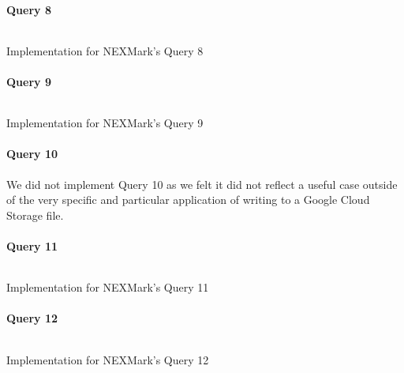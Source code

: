 \paragraph{Query 8}
\begin{listing}[H]
  \inputminted[firstline=680,lastline=689]{rust}{benchmarks/src/nexmark.rs}
  \caption{Implementation for NEXMark's Query 8}
  \label{lst:nexmark-query8}
\end{listing}

\paragraph{Query 9}
\begin{listing}[H]
  \inputminted[firstline=708,lastline=744]{rust}{benchmarks/src/nexmark.rs}
  \caption{Implementation for NEXMark's Query 9}
  \label{lst:nexmark-query9}
\end{listing}

\paragraph{Query 10}
We did not implement Query 10 as we felt it did not reflect a useful case outside of the very specific and particular application of writing to a Google Cloud Storage file.

\paragraph{Query 11}
\begin{listing}[H]
  \inputminted[firstline=791,lastline=794]{rust}{benchmarks/src/nexmark.rs}
  \caption{Implementation for NEXMark's Query 11}
  \label{lst:nexmark-query11}
\end{listing}

\paragraph{Query 12}
\begin{listing}[H]
  \inputminted[firstline=818,lastline=825]{rust}{benchmarks/src/nexmark.rs}
  \caption{Implementation for NEXMark's Query 12}
  \label{lst:nexmark-query12}
\end{listing}

